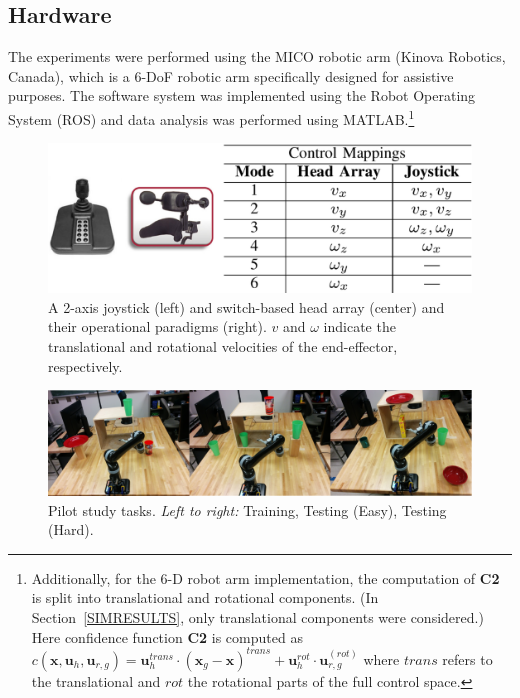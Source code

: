 \documentclass[conference]{IEEEtran}
\begin{document}
 \subsection{Hardware}\label{HARDWARE}
 
 The experiments were performed using the MICO robotic arm (Kinova Robotics, Canada), which is a 6-DoF robotic arm specifically designed for assistive purposes. The software system was implemented using the Robot Operating System (ROS) and data analysis was performed using MATLAB.\footnote{Additionally, for the 6-D robot arm implementation, the computation of \textbf{C2} is split into translational and rotational components. (In Section~\ref{SIMRESULTS}, only translational components were considered.) Here confidence function \textbf{C2} is computed as
 	$c(\boldsymbol{x}, \boldsymbol{u}_h, \boldsymbol{u}_{r,g}) = \boldsymbol{u}_{h}^{trans}\cdot(\boldsymbol{x}_{g} - \boldsymbol{x})^{trans} + \boldsymbol{u}_h^{rot}\cdot\boldsymbol{u}_{r,g}^{(rot)}$
 	where $trans$ refers to the translational and $rot$ the rotational parts of the full control space.}
 \begin{figure}[h]
 	\centering
 	\includegraphics[width = 1\hsize, height = 0.14\vsize]{./figures/INTER_4.eps}
 	\vspace{-0.35cm}
 	\caption{A 2-axis joystick (left) and switch-based head array (center) and their operational paradigms (right). $v$ and $\omega$ indicate the translational and rotational velocities of the end-effector, respectively.}
 	\label{J2_HA}
 \end{figure}
 \begin{figure}[ht]
 	\centering
 	\includegraphics[width = 1\hsize]{./figures/TASKS.png}
 	\caption{Pilot study tasks. \textit{Left to right:} Training, Testing (Easy), Testing (Hard).}
 	\label{TASKS}
 \end{figure}
 
\end{document}
